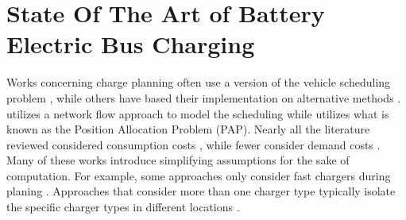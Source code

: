 \documentclass[ee,thesis]{usuthesis}
\begin{document}
\section{State Of The Art of Battery Electric Bus Charging}
\label{sec:state-of-the-art}
Works concerning charge planning often use a version of the vehicle scheduling problem \cite{zhang-2021-optim-elect,duan-2021-refor-mixed,rinaldi-2020-mixed-fleet,tang-2019-robus-sched,li-2014-trans-bus,he-2020-optim-charg},
while others have based their implementation on alternative methods
\cite{qarebagh-2019-optim-sched,whitaker-2023-a-network}. \cite{whitaker-2023-a-network} utilizes a network flow
approach to model the scheduling while \cite{qarebagh-2019-optim-sched} utilizes what is known as the Position
Allocation Problem (PAP). Nearly all the literature reviewed considered consumption costs \cite{jahic-2019-preem,frendo-2021-open-sourc,qin-2016-numer-analy,zhou-2020-bi-objec,duan-2021-refor-mixed,mortensen-2023-cost-minim,zhou-2020-collab-optim,rinaldi-2020-mixed-fleet}, while fewer consider demand costs
\cite{jahic-2019-preem,frendo-2021-open-sourc,qin-2016-numer-analy,mortensen-2023-cost-minim,he-2020-optim-charg}. Many of these works introduce simplifying assumptions for the sake of computation. For example,
some approaches only consider fast chargers during planing \cite{zhou-2020-collab-optim,li-2014-trans-bus,wang-2017-optim-rechar,sebastiani-2016-evaluat-elect,wei-2018-optim-spatio}. Approaches that consider more than one
charger type typically isolate the specific charger types in different locations \cite{tang-2019-robus-sched,he-2020-optim-charg}.
\end{document}
